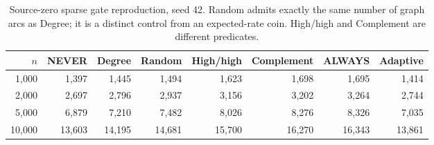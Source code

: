 \begin{table}[tb]\centering\small\setlength{\tabcolsep}{3.5pt}
\caption{Source-zero sparse gate reproduction, seed 42. Random admits exactly the same number of graph arcs as Degree; it is a distinct control from an expected-rate coin. High/high and Complement are different predicates.}
\begin{tabular}{rrrrrrrr}
\toprule
$n$ & NEVER & Degree & Random & High/high & Complement & ALWAYS & Adaptive \\ \midrule
1,000 & 1,397 & 1,445 & 1,494 & 1,623 & 1,698 & 1,695 & 1,414 \\
2,000 & 2,697 & 2,796 & 2,937 & 3,156 & 3,202 & 3,264 & 2,744 \\
5,000 & 6,879 & 7,210 & 7,482 & 8,026 & 8,276 & 8,326 & 7,035 \\
10,000 & 13,603 & 14,195 & 14,681 & 15,700 & 16,270 & 16,343 & 13,861 \\
\bottomrule\end{tabular}\end{table}

